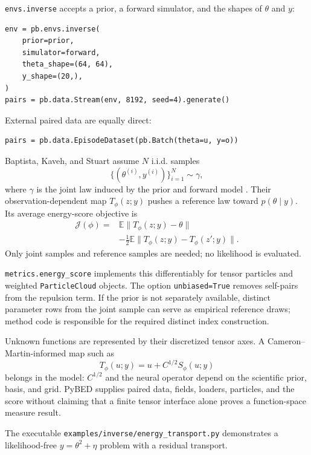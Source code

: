 \documentclass[11pt]{article}
\begin{document}
\texttt{envs.inverse} accepts a prior, a forward simulator, and the shapes of
$\theta$ and $y$:
\begin{lstlisting}
env = pb.envs.inverse(
    prior=prior,
    simulator=forward,
    theta_shape=(64, 64),
    y_shape=(20,),
)
pairs = pb.data.Stream(env, 8192, seed=4).generate()
\end{lstlisting}
External paired data are equally direct:
\begin{lstlisting}
pairs = pb.data.EpisodeDataset(pb.Batch(theta=u, y=o))
\end{lstlisting}

Baptista, Kaveh, and Stuart assume $N$ i.i.d. samples
\begin{equation}
  \{(\theta^{(i)},y^{(i)})\}_{i=1}^{N}\sim\gamma,
\end{equation}
where $\gamma$ is the joint law induced by the prior and forward model
\cite{baptista2026energy}. Their observation-dependent map
$T_\phi(z;y)$ pushes a reference law toward $p(\theta\mid y)$. Its average
energy-score objective is
\begin{align}
 \mathcal J(\phi)
 ={}&\mathbb E\lVert T_\phi(z;y)-\theta\rVert \\
 &-\frac12\mathbb E\lVert
 T_\phi(z;y)-T_\phi(z';y)\rVert .
\end{align}
Only joint samples and reference samples are needed; no likelihood is evaluated.

\texttt{metrics.energy\_score} implements this differentiably for tensor particles
and weighted \texttt{ParticleCloud} objects. The option
\texttt{unbiased=True} removes self-pairs from the repulsion term. If the prior is
not separately available, distinct parameter rows from the joint sample can serve
as empirical reference draws; method code is responsible for the required distinct
index construction.

Unknown functions are represented by their discretized tensor axes. A
Cameron--Martin-informed map such as
\begin{equation}
  T_\phi(u;y)=u+C^{1/2}S_\phi(u;y)
\end{equation}
belongs in the model: $C^{1/2}$ and the neural operator depend on the scientific
prior, basis, and grid. PyBED supplies paired data, fields, loaders, particles, and
the score without claiming that a finite tensor interface alone proves a
function-space measure result.

The executable \texttt{examples/inverse/energy\_transport.py} demonstrates a
likelihood-free $y=\theta^2+\eta$ problem with a residual transport.
\end{document}
